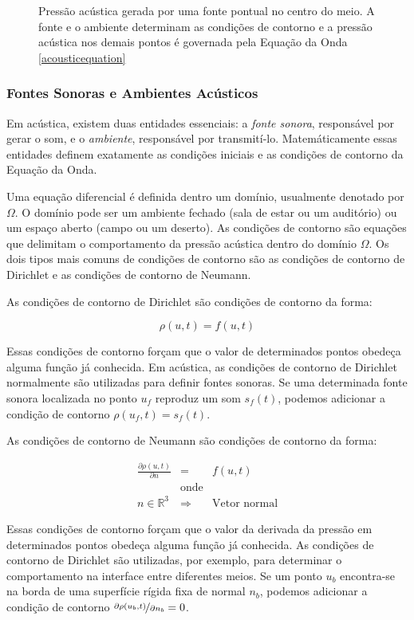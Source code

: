\begin{figure}[ht]
	\centering
	
	\caption[Pressão acústica gerada uma fonte pontual]{Pressão acústica gerada por uma fonte pontual no centro do meio. A fonte e o ambiente determinam as condições de contorno e a pressão acústica nos demais pontos é governada pela Equação da Onda \eqref{acousticequation}}\label{wavefield}
\end{figure}

\subsubsection{Fontes Sonoras e Ambientes Acústicos}

Em acústica, existem duas entidades essenciais: a \emph{fonte sonora}, responsável por gerar o som, e o \emph{ambiente}, responsável por transmití-lo. Matemáticamente essas entidades definem exatamente as condições iniciais e as condições de contorno da Equação da Onda.

Uma equação diferencial é definida dentro um domínio, usualmente denotado por $\Omega$. O domínio pode ser um ambiente fechado (sala de estar ou um auditório) ou um espaço aberto (campo ou um deserto). As condições de contorno são equações que delimitam o comportamento da pressão acústica dentro do domínio $\Omega$. Os dois tipos mais comuns de condições de contorno são as condições de contorno de Dirichlet e as condições de contorno de Neumann.

As condições de contorno de Dirichlet são condições de contorno da forma:

\begin{equation}
	\rho(u, t) = f(u, t)
\end{equation}

Essas condições de contorno forçam que o valor de determinados pontos obedeça alguma função já conhecida. Em acústica, as condições de contorno de Dirichlet normalmente são utilizadas para definir fontes sonoras. Se uma determinada fonte sonora localizada no ponto $u_{f}$ reproduz um som $s_f(t)$, podemos adicionar a condição de contorno $\rho(u_{f}, t) = s_f(t)$.

As condições de contorno de Neumann são condições de contorno da forma:

\begin{eqnarray}
\frac{\partial\rho(u, t)}{\partial n} &=& f(u, t)\\
&\text{onde}& \nonumber \\
n \in \mathbb{R}^3 &\Rightarrow& \text{Vetor normal}\nonumber 
\end{eqnarray}

Essas condições de contorno forçam que o valor da derivada da pressão em determinados pontos obedeça alguma função já conhecida. As condições de contorno de Dirichlet são utilizadas, por exemplo, para determinar o comportamento na interface entre diferentes meios. Se um ponto $u_{b}$ encontra-se na borda de uma superfície rígida fixa de normal $n_b$, podemos adicionar a condição de contorno $\nicefrac{\partial\rho(u_b, t)}{\partial n_b} = 0$.

